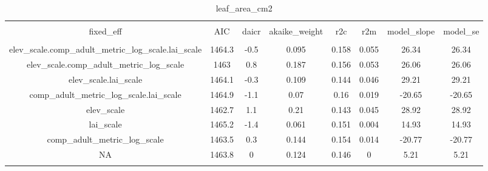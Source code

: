 
\begin{table}[!htbp] \centering 
  \caption{leaf_area_cm2} 
  \label{leaf_area_cm2} 
\begin{tabular}{@{\extracolsep{5pt}} cccccccc} 
\\[-1.8ex]\hline 
\hline \\[-1.8ex] 
fixed\_eff & AIC & daicr & akaike\_weight & r2c & r2m & model\_slope & model\_se \\ 
\hline \\[-1.8ex] 
elev\_scale.comp\_adult\_metric\_log\_scale.lai\_scale & 1464.3 & -0.5 & 0.095 & 0.158 & 0.055 & 26.34 & 26.34 \\ 
elev\_scale.comp\_adult\_metric\_log\_scale & 1463 & 0.8 & 0.187 & 0.156 & 0.053 & 26.06 & 26.06 \\ 
elev\_scale.lai\_scale & 1464.1 & -0.3 & 0.109 & 0.144 & 0.046 & 29.21 & 29.21 \\ 
comp\_adult\_metric\_log\_scale.lai\_scale & 1464.9 & -1.1 & 0.07 & 0.16 & 0.019 & -20.65 & -20.65 \\ 
elev\_scale & 1462.7 & 1.1 & 0.21 & 0.143 & 0.045 & 28.92 & 28.92 \\ 
lai\_scale & 1465.2 & -1.4 & 0.061 & 0.151 & 0.004 & 14.93 & 14.93 \\ 
comp\_adult\_metric\_log\_scale & 1463.5 & 0.3 & 0.144 & 0.154 & 0.014 & -20.77 & -20.77 \\ 
NA & 1463.8 & 0 & 0.124 & 0.146 & 0 & 5.21 & 5.21 \\ 
\hline \\[-1.8ex] 
\end{tabular} 
\end{table} 
